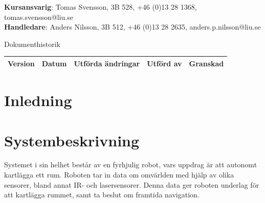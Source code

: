 \documentclass{article}
\begin{document}
\begin{center}
\textbf{Kursansvarig}: Tomas Svensson, 3B 528, +46 (0)13 28 1368, tomas.svensson@liu.se \\
\textbf{Handledare}: Anders Nilsson, 3B 512, +46 (0)13 28 2635, anders.p.nilsson@liu.se
\end{center}
\vspace*{\fill}
\clearpage

\renewcommand*\contentsname{Innehållsförteckning}
\tableofcontents
\clearpage


{
\sffamily
\centering
\large


{\huge 
Dokumenthistorik \\
}
\begin{center}
\begin{tabular}{ | c | c | c | c | c |} 
\hline
\textbf{Version} & \textbf{Datum} & \textbf{Utförda ändringar} & \textbf{Utförd av } & \textbf{Granskad} \\  
\hline
\end{tabular}
\end{center}
}

\clearpage


\section{Inledning}

\clearpage

\section{Systembeskrivning}
Systemet i sin helhet består av en fyrhjulig robot, vars uppdrag är att autonomt kartlägga ett rum. Roboten tar in data om omvärlden med hjälp av olika sensorer, bland annat IR- och lasersensorer. Denna data ger roboten underlag för att kartlägga rummet, samt ta beslut om framtida navigation.  
\end{document}
